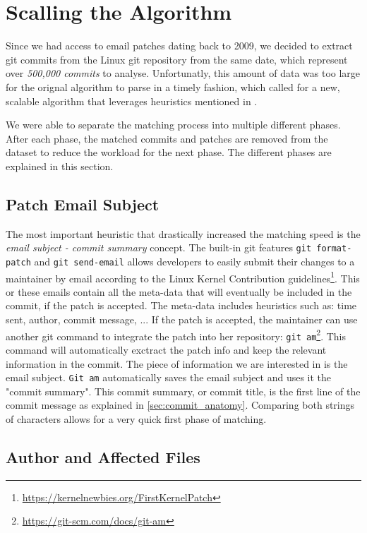 \section{Scalling the Algorithm}

Since we had access to email patches dating back to 2009, we decided to extract git commits from the Linux git repository from the same date, which represent over \textit{500,000 commits} to analyse. Unfortunatly, this amount of data was too large for the orignal algorithm to parse in a timely fashion, which called for a new, scalable algorithm that leverages heuristics mentioned in \citep{msr13jojo,jiang14}.

We were able to separate the matching process into multiple different phases. After each phase, the matched commits and patches are removed from the dataset to reduce the workload for the next phase. The different phases are explained in this section. 

\subsection{Patch Email Subject}

The most important heuristic that drastically increased the matching speed is the \textit{email subject - commit summary} concept. The built-in git features \texttt{git format-patch} and \texttt{git send-email} allows developers to easily submit their changes to a maintainer by email according to the Linux Kernel Contribution guidelines\footnote{\url{https://kernelnewbies.org/FirstKernelPatch}}. This or these emails contain all the meta-data that will eventually be included in the commit, if the patch is accepted. The meta-data includes heuristics such as: time sent, author, commit message, ... If the patch is accepted, the maintainer can use another git command to integrate the patch into her repository: \texttt{git am}\footnote{\url{https://git-scm.com/docs/git-am}}. This command will automatically exctract the patch info and keep the relevant information in the commit. The piece of information we are interested in is the email subject. \texttt{Git am} automatically saves the email subject and uses it the "commit summary". This commit summary, or commit title, is the first line of the commit message as explained in \autoref{sec:commit_anatomy}. Comparing both strings of characters allows for a very quick first phase of matching.



\subsection{Author and Affected Files}

